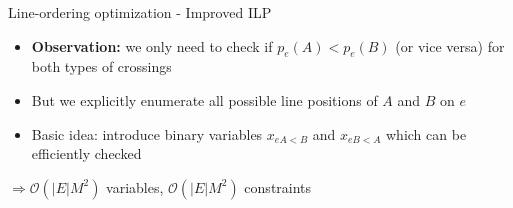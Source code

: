 \documentclass{beamer}
\begin{document}
\begin{frame}{Line-ordering optimization - Improved ILP}	
	\begin{itemize}
		\item \textbf{Observation:} we only need to check if $p_e(A) < p_e(B)$ (or vice versa) for both types of crossings
		\item But we explicitly enumerate all possible line positions of $A$ and $B$ on $e$
		\item \alert{Basic idea:} introduce binary variables $x_{eA<B}$ and $x_{eB<A}$ which can be efficiently checked
	\end{itemize}
	\vspace{0.5cm}
	$\Rightarrow \mathcal{O}(|E|M^2)$ variables, \textcolor{black!40!green}{$\mathcal{O}(|E|M^2)$} constraints
\end{frame}
\end{document}
